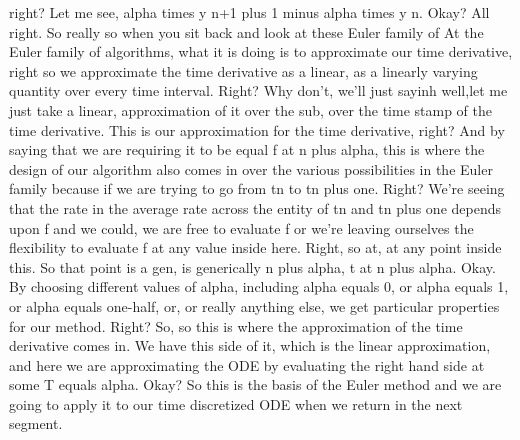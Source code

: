 \documentclass[10pt]{article}
\begin{document}
right? Let me see, alpha times y n+1 plus 1 minus alpha times y n. Okay? All right. So really so when you sit back and look at these Euler family of At the Euler family of algorithms, what it is doing is to approximate our time derivative, right so we approximate the time derivative as a linear, as a linearly varying quantity over every time interval. Right? Why don't, we'll just sayinh well,let me just take a linear, approximation of it over the sub, over the time stamp of the time derivative. This is our approximation for the time derivative, right? And by saying that we are requiring it to be equal f at n plus alpha, this is where the design of our algorithm also comes in over the various possibilities in the Euler family because if we are trying to go from tn to tn plus one. Right? We're seeing that the rate in the average rate across the entity of tn and tn plus one depends upon f and we could, we are free to evaluate f or we're leaving ourselves the flexibility to evaluate f at any value inside here. Right, so at, at any point inside this. So that point is a gen, is generically n plus alpha, t at n plus alpha. Okay. By choosing different values of alpha, including alpha equals 0, or alpha equals 1, or alpha equals one-half, or, or really anything else, we get particular properties for our method. Right? So, so this is where the approximation of the time derivative comes in. We have this side of it, which is the linear approximation, and here we are approximating the ODE by evaluating the right hand side at some T equals alpha. Okay? So this is the basis of the Euler method and we are going to apply it to our time discretized ODE when we return in the next segment.
\end{document}
